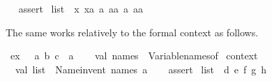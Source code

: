 \begin{isabellebody}
\ \ %
\isaantiq
assert{}%
\endisaantiq
\ {}list{}\ {}\ {}{}x{}{}\ {}xa{}{}\ {}a{}{}\ {}aa{}{}\ {}{}a{}{}\ {}{}aa{}{}{}{}\isanewline
{}%
\endisatagML
{\isafoldML}%
%
\isadelimML
%
\endisadelimML
%
\begin{isamarkuptext}%
\medskip The same works relatively to the formal context as
  follows.%
\end{isamarkuptext}%
\isamarkuptrue%
\isamarkupfalse%
\ ex\ {}\ \ a\ b\ c\ {}{}\ {}a\isanewline
{}\isanewline
%
\isadelimML
\isanewline
%
\endisadelimML
%
\isatagML
{}\isamarkupfalse%
\ {}\isanewline
\ \ val\ names\ {}\ Variable{}names{}of\ %
\isaantiq
context{}%
\endisaantiq
{}\isanewline
\isanewline
\ \ val\ list{}\ {}\ Name{}invent\ names\ {}a{}\ {}{}\isanewline
\ \ %
\isaantiq
assert{}%
\endisaantiq
\ {}list{}\ {}\ {}{}d{}{}\ {}e{}{}\ {}f{}{}\ {}g{}{}\ {}h{}{}{}{}\isanewline

\end{isabellebody}

